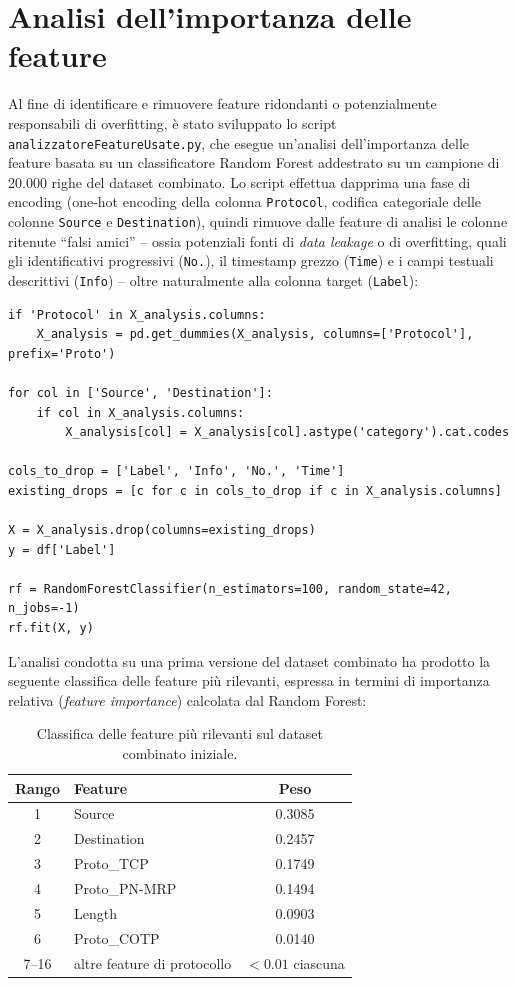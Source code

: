 \documentclass[12pt,a4paper]{report}
\begin{document}
\section{Analisi dell'importanza delle feature}

Al fine di identificare e rimuovere feature ridondanti o potenzialmente responsabili di overfitting, è stato sviluppato lo script \texttt{analizzatoreFeatureUsate.py}, che esegue un'analisi dell'importanza delle feature basata su un classificatore Random Forest addestrato su un campione di 20.000 righe del dataset combinato. Lo script effettua dapprima una fase di encoding (one-hot encoding della colonna \texttt{Protocol}, codifica categoriale delle colonne \texttt{Source} e \texttt{Destination}), quindi rimuove dalle feature di analisi le colonne ritenute ``falsi amici'' -- ossia potenziali fonti di \emph{data leakage} o di overfitting, quali gli identificativi progressivi (\texttt{No.}), il timestamp grezzo (\texttt{Time}) e i campi testuali descrittivi (\texttt{Info}) -- oltre naturalmente alla colonna target (\texttt{Label}):

\begin{lstlisting}[caption={Estratto dello script \texttt{analizzatoreFeatureUsate.py}: preparazione delle feature per l'analisi di importanza}]
if 'Protocol' in X_analysis.columns:
    X_analysis = pd.get_dummies(X_analysis, columns=['Protocol'], prefix='Proto')

for col in ['Source', 'Destination']:
    if col in X_analysis.columns:
        X_analysis[col] = X_analysis[col].astype('category').cat.codes

cols_to_drop = ['Label', 'Info', 'No.', 'Time']
existing_drops = [c for c in cols_to_drop if c in X_analysis.columns]

X = X_analysis.drop(columns=existing_drops)
y = df['Label']

rf = RandomForestClassifier(n_estimators=100, random_state=42, n_jobs=-1)
rf.fit(X, y)
\end{lstlisting}

L'analisi condotta su una prima versione del dataset combinato ha prodotto la seguente classifica delle feature più rilevanti, espressa in termini di importanza relativa (\emph{feature importance}) calcolata dal Random Forest:

\begin{table}[H]
\centering
\begin{tabular}{clc}
\toprule
\textbf{Rango} & \textbf{Feature} & \textbf{Peso} \\
\midrule
1 & Source & 0.3085 \\
2 & Destination & 0.2457 \\
3 & Proto\_TCP & 0.1749 \\
4 & Proto\_PN-MRP & 0.1494 \\
5 & Length & 0.0903 \\
6 & Proto\_COTP & 0.0140 \\
7--16 & altre feature di protocollo & $< 0.01$ ciascuna \\
\bottomrule
\end{tabular}
\caption{Classifica delle feature più rilevanti sul dataset combinato iniziale.}
\end{table}
\end{document}
